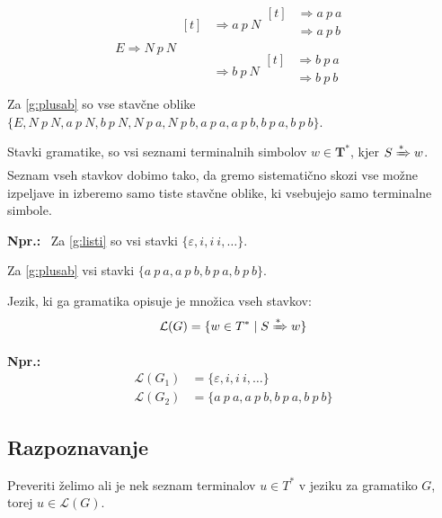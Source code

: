 \documentclass{article}
\newcommand{\Ex}{\textbf{Npr.:}\ }
\newcommand{\Set}[1]{\mathbf{#1}}
\newcommand{\Grammar}{G}
\newcommand{\Terminals}{\Set{T}}
\newcommand{\StartSymbol}{S}
\newcommand{\Null}{\varepsilon}
\newcommand{\Language}[1]{\mathcal{L}(#1)}
\newcommand{\Derive}{\Rightarrow}
\newcommand{\DeriveStar}{\xRightarrow{\ast}}
\newcommand{\Seq}{\ }
\newcommand{\Kleene}[1]{#1^\ast}
\begin{document}
  \begin{equation*}
    E \Derive N \Seq p \Seq N \begin{aligned}[t]
      &\Derive a \Seq p \Seq N \begin{aligned}[t]
        &\Derive a \Seq p \Seq a\\
        &\Derive a \Seq p \Seq b\\
      \end{aligned}\\
      &\Derive b \Seq p \Seq N \begin{aligned}[t]
        &\Derive b \Seq p \Seq a\\
        &\Derive b \Seq p \Seq b\\
      \end{aligned}
    \end{aligned}
  \end{equation*}
Za \ref{g:plusab} so vse stavčne oblike $\{E, N \Seq p \Seq N, a \Seq p \Seq N, b \Seq p \Seq N, N \Seq p \Seq a, N \Seq p \Seq b, a \Seq p \Seq a, a \Seq p \Seq b, b \Seq p \Seq a, b \Seq p \Seq b \}$.

Stavki gramatike, so vsi seznami terminalnih simbolov $w \in \Kleene{\Terminals}$, kjer $\StartSymbol \DeriveStar w$.
Seznam vseh stavkov dobimo tako, da gremo sistematično skozi vse možne izpeljave in izberemo samo tiste stavčne oblike, ki vsebujejo samo terminalne simbole.

\Ex
Za \ref{g:listi} so vsi stavki $\{\Null, i, i \Seq i, \dots\}$.

Za \ref{g:plusab} vsi stavki $\{a \Seq p \Seq a, a \Seq p \Seq b, b \Seq p \Seq a, b \Seq p \Seq b \}$.

Jezik, ki ga gramatika opisuje je množica vseh stavkov:
\begin{equation*}
  \Language{\Grammar} = \{ w \in \Kleene{T} \mid \StartSymbol \DeriveStar w\}
\end{equation*}

\Ex
  \begin{align*}
    \Language{\Grammar_1} &= \{\Null, i, i \Seq i, \dots\}\\
    \Language{\Grammar_2} &= \{a \Seq p \Seq a, a \Seq p \Seq b, b \Seq p \Seq a, b \Seq p \Seq b \}
  \end{align*}

\subsection{Razpoznavanje}

Preveriti želimo ali je nek seznam terminalov $u \in \Kleene{T}$ v jeziku za gramatiko $\Grammar$, torej $u \in \Language{\Grammar}$.
\end{document}
